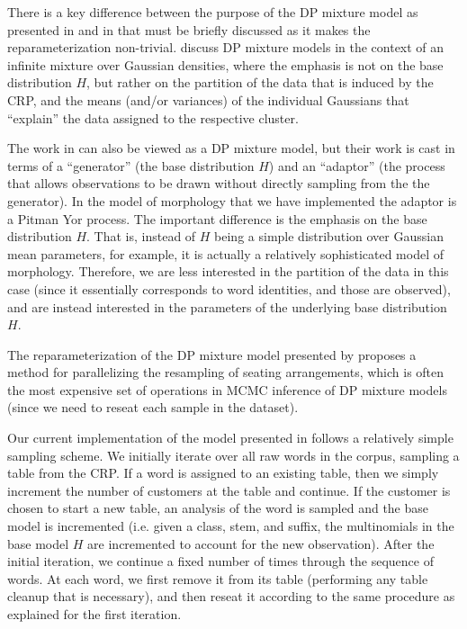 \documentclass{article}
\begin{document}
There is a key difference between the purpose of the DP mixture model
as presented in \cite{lovell2012} and in \cite{goldwater2011} that
must be briefly discussed as it makes the reparameterization
non-trivial. \cite{lovell2012} discuss DP mixture models in the
context of an infinite mixture over Gaussian densities, where the
emphasis is not on the base distribution $H$, but rather on the
partition of the data that is induced by the CRP, and the means
(and/or variances) of the individual Gaussians that ``explain'' the
data assigned to the respective cluster.

The work in \cite{goldwater2011} can also be viewed as a DP mixture
model, but their work is cast in terms of a ``generator'' (the base
distribution $H$) and an ``adaptor'' (the process that allows
observations to be drawn without directly sampling from the the
generator). In the model of morphology that we have implemented the
adaptor is a Pitman Yor process. The important difference is the
emphasis on the base distribution $H$. That is, instead of $H$ being a
simple distribution over Gaussian mean parameters, for example, it is
actually a relatively sophisticated model of morphology. Therefore, we
are less interested in the partition of the data in this case (since
it essentially corresponds to word identities, and those are
observed), and are instead interested in the parameters of the
underlying base distribution $H$.

The reparameterization of the DP mixture model presented by
\cite{lovell2012} proposes a method for parallelizing the resampling
of seating arrangements, which is often the most expensive set of
operations in MCMC inference of DP mixture models (since we need to
reseat each sample in the dataset).

Our current implementation of the model presented in
\cite{goldwater2011} follows a relatively simple sampling scheme. We
initially iterate over all raw words in the corpus, sampling a table
from the CRP. If a word is assigned to an existing table, then we
simply increment the number of customers at the table and continue. If
the customer is chosen to start a new table, an analysis of the word
is sampled and the base model is incremented (i.e. given a class,
stem, and suffix, the multinomials in the base model $H$ are
incremented to account for the new observation). After the initial
iteration, we continue a fixed number of times through the sequence of
words. At each word, we first remove it from its table (performing any
table cleanup that is necessary), and then reseat it according to the
same procedure as explained for the first iteration.
\end{document}
